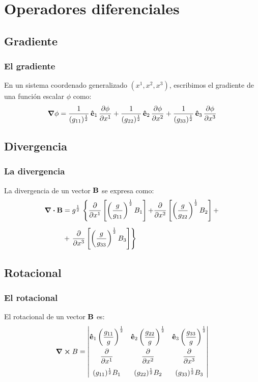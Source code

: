\documentclass[12pt]{beamer}
\begin{document}
\section{Operadores diferenciales}

\subsection{Gradiente}

\begin{frame}
\frametitle{El gradiente}
En un sistema coordenado generalizado $(x^{1}, x^{2}, x^{3})$, escribimos el gradiente de una función escalar $\phi$ como:
\pause
\begin{align*}
\grad{\phi} = \dfrac{1}{(g_{11})^{\frac{1}{2}}} \, \vu{e}_{1} \, \pdv{\phi}{x^{1}} + \dfrac{1}{(g_{22})^{\frac{1}{2}}} \, \vu{e}_{2} \, \pdv{\phi}{x^{2}} + \dfrac{1}{(g_{33})^{\frac{1}{2}}} \, \vu{e}_{3} \, \pdv{\phi}{x^{3}}
\end{align*}
\end{frame}

\subsection{Divergencia}

\begin{frame}
\frametitle{La divergencia}
La divergencia de un vector $\vb{B}$ se expresa como:
\pause
\begin{align*}
\div{\vb{B}} &= g^{\frac{1}{2}} \, \left\{ \pdv{x^{1}} \left[ \left( \dfrac{g}{g_{11}} \right)^{\frac{1}{2}} B_{1} \right] {+} \pdv{x^{2}} \left[ \left( \dfrac{g}{g_{22}} \right)^{\frac{1}{2}} B_{2} \right] + \right. \\[0.5em] 
&+ \left. \pdv{x^{3}} \left[ \left( \dfrac{g}{g_{33}} \right)^{\frac{1}{2}} B_{3} \right] \right\}
\end{align*}
\end{frame}

\subsection{Rotacional}

\begin{frame}
\frametitle{El rotacional}
El rotacional de un vector $\vb{B}$ es:
\pause
\begin{align*}
\curl{B} = \mqty|
\vu{e}_{1} \left( \dfrac{g_{11}}{g} \right)^{\frac{1}{2}} & \vu{e}_{2} \left( \dfrac{g_{22}}{g} \right)^{\frac{1}{2}} & \vu{e}_{3} \left( \dfrac{g_{33}}{g} \right)^{\frac{1}{2}} \\[1em]
\displaystyle \pdv{x^{1}} & \displaystyle \pdv{x^{2}} & \displaystyle \pdv{x^{3}} \\[1em]
(g_{11})^{\frac{1}{2}} B_{1} & (g_{22})^{\frac{1}{2}} B_{2} & (g_{33})^{\frac{1}{2}} B_{3}
|
\end{align*}
\end{frame}
\end{document}
